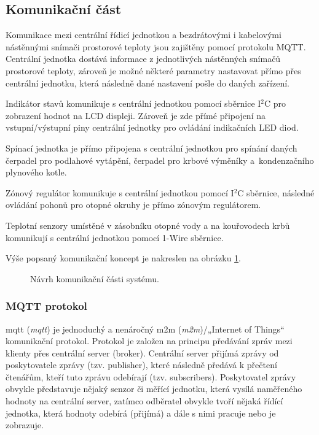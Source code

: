\subsection{Komunikační část}

Komunikace mezi centrální řídicí jednotkou a bezdrátovými i kabelovými nástěnnými snímači prostorové teploty jsou zajištěny pomocí protokolu MQTT. Centrální jednotka dostává informace z jednotlivých nástěnných snímačů prostorové teploty, zároveň je možné některé parametry nastavovat přímo přes centrální jednotku, která následně dané nastavení pošle do daných zařízení.

Indikátor stavů komunikuje s centrální jednotkou pomocí sběrnice I$^2$C pro zobrazení hodnot na LCD displeji. Zároveň je zde přímé připojení na vstupní/výstupní piny centrální jednotky pro ovládání indikačních LED diod.

Spínací jednotka je přímo připojena s centrální jednotkou pro spínání daných čerpadel pro podlahové vytápění, čerpadel pro krbové výměníky a~kondenzačního plynového kotle.

Zónový regulátor komunikuje s centrální jednotkou pomocí I$^2$C sběrnice, následné ovládání pohonů pro otopné okruhy je přímo zónovým regulátorem.

Teplotní senzory umístěné v zásobníku otopné vody a na kouřovodech krbů komunikují s centrální jednotkou pomocí 1-Wire sběrnice.

Výše popsaný komunikační koncept je nakreslen na obrázku \ref{fig:navrh-softwarove-casti}.

\begin{figure}[H]
    \centering
    \def\svgwidth{\columnwidth}
    
    \caption{Návrh komunikační části systému.}
    \label{fig:navrh-softwarove-casti}
\end{figure}

\subsubsection{MQTT protokol}
\label{sec:mqtt-protokol}

\acrshort{mqtt} (\textit{\acrlong{mqtt}}) je jednoduchý a nenáročný \acrshort{m2m} (\textit{\acrlong{m2m}})/„Internet of Things“ komunikační protokol. Protokol je založen na principu předávání zpráv mezi klienty přes centrální server (broker). Centrální server přijímá zprávy od poskytovatele zprávy (tzv. publisher), které následně předává k přečtení čtenářům, kteří tuto zprávu odebírají (tzv. subscribers). Poskytovatel zprávy obvykle představuje nějaký senzor či měřící jednotku, která vysílá naměřeného hodnoty na centrální server, zatímco odběratel obvykle tvoří nějaká řídící jednotka, která hodnoty odebírá (přijímá) a dále s nimi pracuje nebo je zobrazuje.

